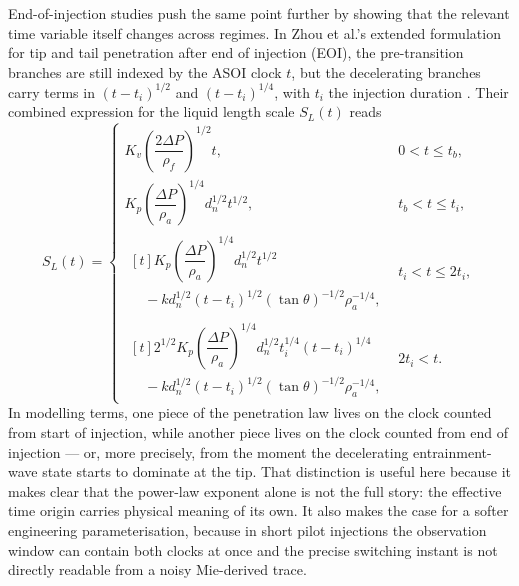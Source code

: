 \documentclass[english, 12pt, a4paper, elec, utf8, a-2b, online]{aaltothesis}
\begin{document}
End-of-injection studies push the same point further by showing that the relevant time variable itself changes across regimes. 
In Zhou et al.'s extended formulation for tip and tail penetration after end of injection (EOI), 
the pre-transition branches are still indexed by the ASOI clock \(t\), 
but the decelerating branches carry terms in \((t-t_i)^{1/2}\) and \((t-t_i)^{1/4}\), 
with \(t_i\) the injection duration \cite{ZhouLiLaiWei2019}. 
Their combined expression for the liquid length scale \(S_L(t)\) reads
\[
S_L(t)=
\begin{cases}
K_v \left( \dfrac{2\Delta P}{\rho_f} \right)^{1/2} t,
& 0 < t \le t_b,\\[6pt]
K_p \left( \dfrac{\Delta P}{\rho_a} \right)^{1/4} d_n^{1/2} t^{1/2},
& t_b < t \le t_i,\\[6pt]
\begin{aligned}[t]
K_p \left( \dfrac{\Delta P}{\rho_a} \right)^{1/4} d_n^{1/2} t^{1/2}\\
\quad - k d_n^{1/2}(t-t_i)^{1/2}(\tan\theta)^{-1/2}\rho_a^{-1/4},
\end{aligned}
& t_i < t \le 2t_i,\\[6pt]
\begin{aligned}[t]
2^{1/2} K_p \left( \dfrac{\Delta P}{\rho_a} \right)^{1/4} d_n^{1/2} t_i^{1/4}(t-t_i)^{1/4}\\
\quad - k d_n^{1/2}(t-t_i)^{1/2}(\tan\theta)^{-1/2}\rho_a^{-1/4},
\end{aligned}
& 2t_i < t.
\end{cases}
\]
In modelling terms, one piece of the penetration law lives on the clock counted from start of injection, 
while another piece lives on the clock counted from end of injection 
--- or, more precisely, from the moment the decelerating entrainment-wave state starts to dominate at the tip. 
That distinction is useful here because it makes clear that the power-law exponent alone is not the full story: 
the effective time origin carries physical meaning of its own. 
It also makes the case for a softer engineering parameterisation, 
because in short pilot injections the observation window can contain both clocks at once and the precise switching instant 
is not directly readable from a noisy Mie-derived trace.
\end{document}
